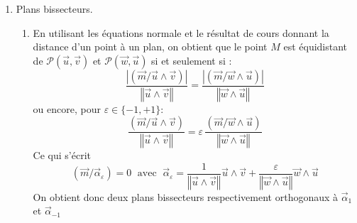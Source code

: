 \begin{enumerate}
\item Plans \og bissecteurs\fg.
\begin{enumerate}
 \item En utilisant les équations normale et le résultat de cours donnant la distance d'un point à un plan, on obtient que le point $M$ est équidistant de $\mathcal P (\overrightarrow u , \overrightarrow v)$ et $\mathcal P (\overrightarrow w , \overrightarrow u)$ si et seulement si :
\begin{equation*}
 \frac{\left\vert (\overrightarrow m / \overrightarrow u \wedge \overrightarrow v)\right\vert}
   {\left\Vert \overrightarrow u \wedge \overrightarrow v \right\Vert}
= \frac{\left\vert (\overrightarrow m / \overrightarrow w \wedge \overrightarrow u)\right\vert }
   {\left\Vert \overrightarrow w \wedge \overrightarrow u \right\Vert}
\end{equation*}
ou encore, pour $\varepsilon\in \{-1,+1\}$:
\begin{equation*}
 \frac{ (\overrightarrow m / \overrightarrow u \wedge \overrightarrow v)}
   {\left\Vert \overrightarrow u \wedge \overrightarrow v \right\Vert}
= \varepsilon\,
\frac{(\overrightarrow m / \overrightarrow w \wedge \overrightarrow u) }
   {\left\Vert \overrightarrow w \wedge \overrightarrow u \right\Vert}
\end{equation*}
Ce qui s'écrit
\begin{displaymath}
 (\overrightarrow m / \overrightarrow \alpha_\varepsilon ) = 0
\;\text{ avec }\;  \overrightarrow \alpha_\varepsilon =
\frac{1}{\left\Vert \overrightarrow u \wedge \overrightarrow v \right\Vert}\overrightarrow u \wedge \overrightarrow v 
+
\frac{\varepsilon}{\left\Vert \overrightarrow w \wedge \overrightarrow u \right\Vert}\overrightarrow w \wedge \overrightarrow u 
\end{displaymath}
On obtient donc deux plans bissecteurs respectivement orthogonaux à $\overrightarrow \alpha_1$ et $\overrightarrow \alpha_{-1}$


\end{enumerate}
\end{enumerate}
